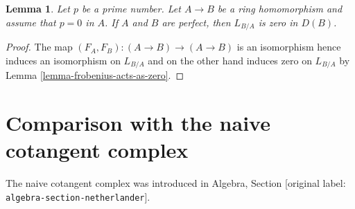 \documentclass[10pt,a4paper]{article}
\theoremstyle{plain}
\newtheorem{lemma}[subsection]{Lemma}
\theoremstyle{definition}
\theoremstyle{remark}
\numberwithin{equation}{subsection}
\begin{document}
\begin{lemma}
\label{lemma-perfect-zero}
Let $p$ be a prime number. Let $A \to B$ be a ring homomorphism
and assume that $p = 0$ in $A$. If $A$ and $B$ are perfect, then
$L_{B/A}$ is zero in $D(B)$.
\end{lemma}

\begin{proof}
The map $(F_A, F_B) : (A \to B) \to (A \to B)$ is an isomorphism
hence induces an isomorphism on $L_{B/A}$ and on the other hand
induces zero on $L_{B/A}$ by Lemma \ref{lemma-frobenius-acts-as-zero}.
\end{proof}





\section{Comparison with the naive cotangent complex}
\label{section-surjections}

\noindent
The naive cotangent complex was introduced in
Algebra, Section \textnormal{[original label: \nolinkurl{algebra-section-netherlander}]}.
\end{document}

